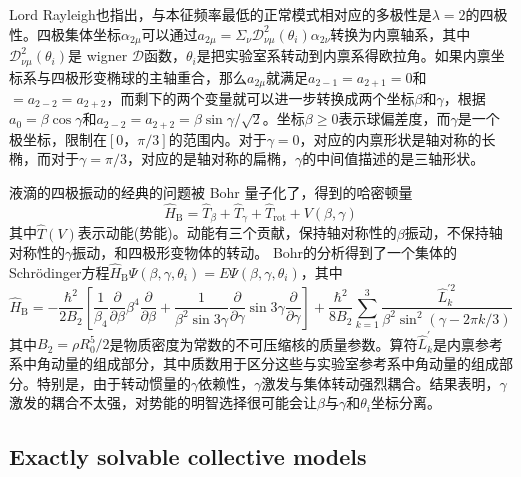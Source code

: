 Lord Rayleigh也指出，与本征频率最低的正常模式相对应的多极性是$\lambda=2$的四极性。四极集体坐标$\alpha_{2\mu}$可以通过$a_{2\mu}=\Sigma_\nu\mathcal{D}_{\nu\mu}^2(\theta_i)\alpha_{2\nu}$转换为内禀轴系，其中$\mathcal{D}_{\nu\mu}^2(\theta_i)$是 wigner $\mathcal{D}$函数，$\theta_i$是把实验室系转动到内禀系得欧拉角。如果内禀坐标系与四极形变椭球的主轴重合，那么$a_{2\mu}$就满足$a_{2-1}=a_{2+1}=0$和$=a_{2-2}=a_{2+2}$，而剩下的两个变量就可以进一步转换成两个坐标$\beta$和$\gamma$，根据$a_0=\beta\cos\gamma$和$a_{2-2}=a_{2+2}=\beta\sin\gamma/\sqrt{2}$。坐标$\beta\ge0$表示球偏差度，而$\gamma$是一个极坐标，限制在$[0，\pi/3]$的范围内。对于$\gamma=0$，对应的内禀形状是轴对称的长椭，而对于$\gamma=\pi/3$，对应的是轴对称的扁椭，$\gamma$的中间值描述的是三轴形状。

液滴的四极振动的经典的问题被 Bohr 量子化了，得到的哈密顿量
\begin{equation*}
\hat{H}_\textrm{B}=\hat{T}_\beta+\hat{T}_\gamma+\hat{T}_\textrm{rot}+V(\beta,\gamma)
\end{equation*}
其中$\hat{T}(V)$表示动能(势能)。动能有三个贡献，保持轴对称性的$\beta$振动，不保持轴对称性的$\gamma$振动，和四极形变物体的转动。 Bohr的分析得到了一个集体的Schr\"{o}dinger方程$\hat{H}_\textrm{B}\Psi(\beta,\gamma,\theta_i)=E\Psi(\beta,\gamma,\theta_i)$，其中
\begin{equation}\label{eq_30}
\hat{H}_\textrm{B}=-\frac{\hbar^2}{2B_2}\left[\frac{1}{\beta_4}\frac{\partial}{\partial\beta}\beta^4\frac{\partial}{\partial\beta}+\frac{1}{\beta^2\sin3\gamma}\frac{\partial}{\partial\gamma}\sin3\gamma\frac{\partial}{\partial\gamma}\right]+\frac{\hbar^2}{8B_2}\sum_{k=1}^3\frac{\hat{L}^{\prime2}_k}{\beta^2\sin^2(\gamma-2\pi k/3)}
\end{equation}
其中$B_2=\rho R_0^5/2$是物质密度为常数的不可压缩核的质量参数。算符$\hat{L}^{\prime}_k$是内禀参考系中角动量的组成部分，其中质数用于区分这些与实验室参考系中角动量的组成部分。特别是，由于转动惯量的$\gamma$依赖性，$\gamma$激发与集体转动强烈耦合。结果表明，$\gamma$激发的耦合不太强，对势能的明智选择很可能会让$\beta$与$\gamma$和$\theta_i$坐标分离。

\subsection{Exactly solvable collective models}

